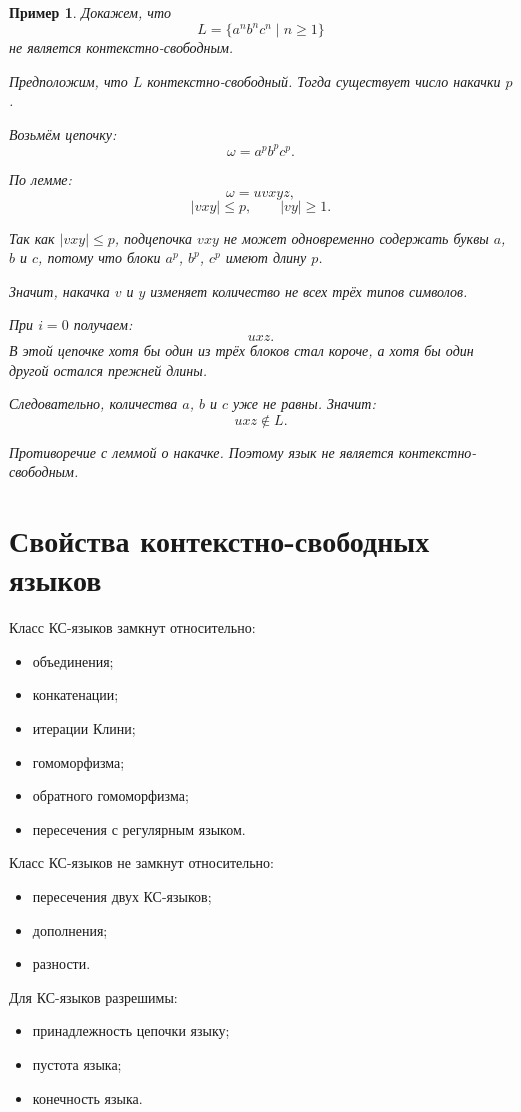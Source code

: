 \documentclass[12pt,a4paper]{article}
\newtheorem{example}{Пример}
\begin{document}
\begin{example}
Докажем, что
\[
L=\{a^n b^n c^n\mid n\ge 1\}
\]
не является контекстно-свободным.

Предположим, что $L$ контекстно-свободный. Тогда существует число накачки $p$.

Возьмём цепочку:
\[
\omega=a^p b^p c^p.
\]

По лемме:
\[
\omega=uvxyz,
\]
\[
|vxy|\le p,\qquad |vy|\ge 1.
\]

Так как $|vxy|\le p$, подцепочка $vxy$ не может одновременно содержать буквы $a$, $b$ и $c$, потому что блоки $a^p$, $b^p$, $c^p$ имеют длину $p$.

Значит, накачка $v$ и $y$ изменяет количество не всех трёх типов символов.

При $i=0$ получаем:
\[
uxz.
\]
В этой цепочке хотя бы один из трёх блоков стал короче, а хотя бы один другой остался прежней длины.

Следовательно, количества $a$, $b$ и $c$ уже не равны. Значит:
\[
uxz\notin L.
\]

Противоречие с леммой о накачке. Поэтому язык не является контекстно-свободным.
\end{example}

\section{Свойства контекстно-свободных языков}

Класс КС-языков замкнут относительно:
\begin{itemize}
    \item объединения;
    \item конкатенации;
    \item итерации Клини;
    \item гомоморфизма;
    \item обратного гомоморфизма;
    \item пересечения с регулярным языком.
\end{itemize}

Класс КС-языков не замкнут относительно:
\begin{itemize}
    \item пересечения двух КС-языков;
    \item дополнения;
    \item разности.
\end{itemize}

Для КС-языков разрешимы:
\begin{itemize}
    \item принадлежность цепочки языку;
    \item пустота языка;
    \item конечность языка.
\end{itemize}
\end{document}
